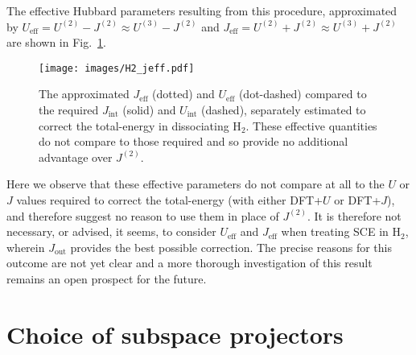{
The effective Hubbard parameters 
resulting from this procedure, 
approximated  by   
$U_\textrm{eff}=U^{(2)}-J^{(2)}\approx U^{(3)}-J^{(2)}$ 
and $J_\textrm{eff}=U^{(2)}+J^{(2)}\approx U^{(3)}+J^{(2)}$ 
are shown in Fig.~\ref{fig:H2_ueff_jeff}.
%
\begin{figure}[th!]
\centering
\texttt{[image: images/H2\_jeff.pdf]}
\caption[Approximated  $U_\textrm{eff}$ and $J_\textrm{eff}$ for dissociating H$_2$]
{The approximated $J_\textrm{eff}$ (dotted) 
and $U_\textrm{eff}$ (dot-dashed)  
compared to the required  
$J_\textrm{int}$ (solid) and $U_\textrm{int}$ (dashed), 
separately estimated to correct the total-energy in dissociating H$_2$.
%
These effective quantities do not compare 
to those required and so provide no additional advantage 
over $J^{(2)}.$}
\label{fig:H2_ueff_jeff}
\end{figure}
%
Here we observe 
that these effective parameters 
do not compare at all to the 
$U$ or $J$ values required to correct the total-energy 
(with either DFT+$U$ or DFT+$J$), 
and therefore suggest no reason to 
use them in place of $J^{(2)}$.
%
It is therefore not necessary, or advised, it seems, 
to consider $U_\textrm{eff}$ and $J_\textrm{eff}$ 
when treating SCE in H$_2$, 
wherein $J_\textrm{out}$ provides the best possible correction.
%
The precise reasons for this outcome are 
not yet clear and a more 
thorough investigation of this result 
remains an open prospect for the future.}


\section{Choice of subspace projectors}
\label{sec:subspace_projectors}


